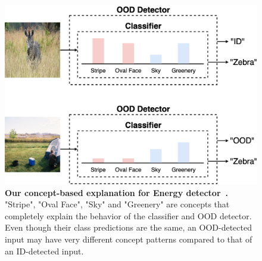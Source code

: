 \begin{figure}
\begin{center}
\includegraphics[scale=0.17]{figures/separability.png} 
\vspace{-3mm}
\caption{\small \textbf{Our concept-based explanation for Energy detector~\citep{liu2020energy}.} "Stripe", "Oval Face", "Sky" and "Greenery" are concepts that completely explain the behavior of the classifier and OOD detector.
Even though their class predictions are the same, an OOD-detected input may have very different concept patterns compared to that of an ID-detected input.}
\label{fig:detection-separability}
\end{center}
\vspace{-0.12in}
\end{figure}

